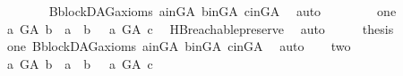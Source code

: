 \begin{isabellebody}
\ \ \ \ \ \ \isamarkupfalse%
\ B{}{\isachardot}{\kern0pt}blockDAG{\isacharunderscore}{\kern0pt}axioms\ a{\isacharunderscore}{\kern0pt}in{\isacharunderscore}{\kern0pt}G{\isacharunderscore}{\kern0pt}A\ b{\isacharunderscore}{\kern0pt}in{\isacharunderscore}{\kern0pt}G{\isacharunderscore}{\kern0pt}A\ c{\isacharunderscore}{\kern0pt}in{\isacharunderscore}{\kern0pt}G{\isacharunderscore}{\kern0pt}A\ \isamarkupfalse%
\ auto\isanewline
\ \ \isamarkupfalse%
\isanewline
\ \ \ \ \isamarkupfalse%
\ one\isanewline
\ \ \ \ \isamarkupfalse%
\ \isamarkupfalse%
\ {\isachardoublequoteopen}{\isacharparenleft}{\kern0pt}a\ {\isasymrightarrow}\isactrlsup {\isacharplus}{\kern0pt}\isactrlbsub G{\isacharunderscore}{\kern0pt}A\isactrlesub \ b\ {\isasymor}\ a\ {\isacharequal}{\kern0pt}\ b{\isacharparenright}{\kern0pt}\ {\isasymand}\ {\isacharparenleft}{\kern0pt}{\isasymnot}\ a\ {\isasymrightarrow}\isactrlsup {\isacharplus}{\kern0pt}\isactrlbsub G{\isacharunderscore}{\kern0pt}A\isactrlesub \ c{\isacharparenright}{\kern0pt}{\isachardoublequoteclose}\ \isamarkupfalse%
\ HB{}{\isachardot}{\kern0pt}reachable{}{\isacharunderscore}{\kern0pt}preserve\ \isamarkupfalse%
\ auto\isanewline
\ \ \isamarkupfalse%
\ \isamarkupfalse%
\ {\isacharquery}{\kern0pt}thesis\ \isamarkupfalse%
\ one\ B{}{\isachardot}{\kern0pt}blockDAG{\isacharunderscore}{\kern0pt}axioms\ a{\isacharunderscore}{\kern0pt}in{\isacharunderscore}{\kern0pt}G{\isacharunderscore}{\kern0pt}A\ b{\isacharunderscore}{\kern0pt}in{\isacharunderscore}{\kern0pt}G{\isacharunderscore}{\kern0pt}A\ c{\isacharunderscore}{\kern0pt}in{\isacharunderscore}{\kern0pt}G{\isacharunderscore}{\kern0pt}A\ \isamarkupfalse%
\ auto\isanewline
{}\isamarkupfalse%
\isanewline
\ \ \isamarkupfalse%
\ two\isanewline
\ \ \isamarkupfalse%
\ \isamarkupfalse%
\ {\isachardoublequoteopen}{\isasymnot}{\isacharparenleft}{\kern0pt}{\isacharparenleft}{\kern0pt}a\ {\isasymrightarrow}\isactrlsup {\isacharplus}{\kern0pt}\isactrlbsub G{\isacharunderscore}{\kern0pt}A\isactrlesub \ b\ {\isasymor}\ a\ {\isacharequal}{\kern0pt}\ b{\isacharparenright}{\kern0pt}\ {\isasymand}\ {\isacharparenleft}{\kern0pt}{\isasymnot}\ a\ {\isasymrightarrow}\isactrlsup {\isacharplus}{\kern0pt}\isactrlbsub G{\isacharunderscore}{\kern0pt}A\isactrlesub \ c{\isacharparenright}{\kern0pt}{\isacharparenright}{\kern0pt}{\isachardoublequoteclose}\ \isamarkupfalse%

\end{isabellebody}
